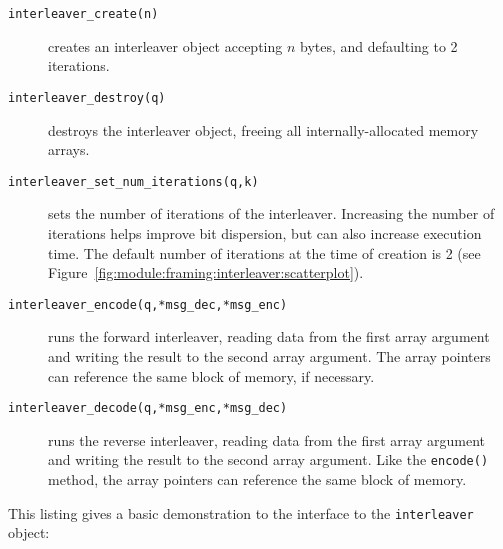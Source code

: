 \begin{description}
\item[{\tt interleaver\_create(n)}]
    creates an interleaver object accepting $n$ bytes,
    and defaulting to 2 iterations.
\item[{\tt interleaver\_destroy(q)}]
    destroys the interleaver object, freeing all internally-allocated
    memory arrays.
\item[{\tt interleaver\_set\_num\_iterations(q,k)}]
    sets the number of iterations of the interleaver.
    Increasing the number of iterations helps improve bit dispersion, but can
    also increase execution time.
    The default number of iterations at the time of creation is 2 (see
    Figure~\ref{fig:module:framing:interleaver:scatterplot}).
\item[{\tt interleaver\_encode(q,*msg\_dec,*msg\_enc)}]
    runs the forward interleaver, reading data from the first array argument
    and writing the result to the second array argument.
    The array pointers can reference the same block of memory, if necessary.
\item[{\tt interleaver\_decode(q,*msg\_enc,*msg\_dec)}]
    runs the reverse interleaver, reading data from the first array argument
    and writing the result to the second array argument.
    Like the {\tt encode()} method, the array pointers can reference the same
    block of memory.
\end{description}
%
This listing gives a basic demonstration to the interface to the
{\tt interleaver} object:
%



